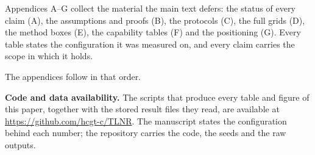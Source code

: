 
\appendix

Appendices A--G collect the material the main text defers: the status of every claim (A), the assumptions and proofs (B), the protocols (C), the full grids (D), the method boxes (E), the capability tables (F) and the positioning (G). Every table states the configuration it was measured on, and every claim carries the scope in which it holds.

The appendices follow in that order.

\textbf{Code and data availability.} The scripts that produce every table and figure of this paper, together with the stored result files they read, are available at \url{https://github.com/hcgt-c/TLNR}. The manuscript states the configuration behind each number; the repository carries the code, the seeds and the raw outputs.
